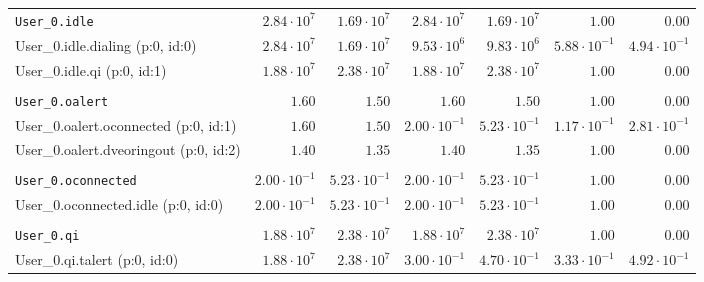 \begin{table}[htbp]
{\begin{tabular}{lrrrrrr}
\\[-8pt]\texttt{User\_0.idle}                         &  $2.84 \cdot 10^{7}$ &  $1.69 \cdot 10^{7}$ &  $2.84 \cdot 10^{7}$ &  $1.69 \cdot 10^{7}$ &               $1.00$ &               $0.00$ \\
\hspace{3mm}User\_0.idle.dialing (p:0, id:0)          &  $2.84 \cdot 10^{7}$ &  $1.69 \cdot 10^{7}$ &  $9.53 \cdot 10^{6}$ &  $9.83 \cdot 10^{6}$ & $5.88 \cdot 10^{-1}$ & $4.94 \cdot 10^{-1}$ \\
\hspace{3mm}User\_0.idle.qi (p:0, id:1)               &  $1.88 \cdot 10^{7}$ &  $2.38 \cdot 10^{7}$ &  $1.88 \cdot 10^{7}$ &  $2.38 \cdot 10^{7}$ &               $1.00$ &               $0.00$ \\
\\[-8pt]\texttt{User\_0.oalert}                       &               $1.60$ &               $1.50$ &               $1.60$ &               $1.50$ &               $1.00$ &               $0.00$ \\
\hspace{3mm}User\_0.oalert.oconnected (p:0, id:1)     &               $1.60$ &               $1.50$ & $2.00 \cdot 10^{-1}$ & $5.23 \cdot 10^{-1}$ & $1.17 \cdot 10^{-1}$ & $2.81 \cdot 10^{-1}$ \\
\hspace{3mm}User\_0.oalert.dveoringout (p:0, id:2)    &               $1.40$ &               $1.35$ &               $1.40$ &               $1.35$ &               $1.00$ &               $0.00$ \\
\\[-8pt]\texttt{User\_0.oconnected}                   & $2.00 \cdot 10^{-1}$ & $5.23 \cdot 10^{-1}$ & $2.00 \cdot 10^{-1}$ & $5.23 \cdot 10^{-1}$ &               $1.00$ &               $0.00$ \\
\hspace{3mm}User\_0.oconnected.idle (p:0, id:0)       & $2.00 \cdot 10^{-1}$ & $5.23 \cdot 10^{-1}$ & $2.00 \cdot 10^{-1}$ & $5.23 \cdot 10^{-1}$ &               $1.00$ &               $0.00$ \\
\\[-8pt]\texttt{User\_0.qi}                           &  $1.88 \cdot 10^{7}$ &  $2.38 \cdot 10^{7}$ &  $1.88 \cdot 10^{7}$ &  $2.38 \cdot 10^{7}$ &               $1.00$ &               $0.00$ \\
\hspace{3mm}User\_0.qi.talert (p:0, id:0)             &  $1.88 \cdot 10^{7}$ &  $2.38 \cdot 10^{7}$ & $3.00 \cdot 10^{-1}$ & $4.70 \cdot 10^{-1}$ & $3.33 \cdot 10^{-1}$ & $4.92 \cdot 10^{-1}$ \\

\end{tabular}}
\end{table}
